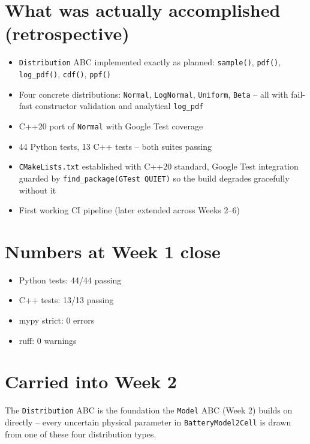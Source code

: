 \documentclass[11pt]{article}
\begin{document}
\section*{What was actually accomplished (retrospective)}

\begin{itemize}[leftmargin=*]
  \item \texttt{Distribution} ABC implemented exactly as planned:
    \texttt{sample()}, \texttt{pdf()}, \texttt{log\_pdf()},
    \texttt{cdf()}, \texttt{ppf()}
  \item Four concrete distributions: \texttt{Normal}, \texttt{LogNormal},
    \texttt{Uniform}, \texttt{Beta} -- all with fail-fast constructor
    validation and analytical \texttt{log\_pdf}
  \item C++20 port of \texttt{Normal} with Google Test coverage
  \item 44 Python tests, 13 C++ tests -- both suites passing
  \item \texttt{CMakeLists.txt} established with C++20 standard,
    Google Test integration guarded by \texttt{find\_package(GTest QUIET)}
    so the build degrades gracefully without it
  \item First working CI pipeline (later extended across Weeks 2--6)
\end{itemize}

\section*{Numbers at Week 1 close}
\begin{itemize}[leftmargin=*]
  \item Python tests: 44/44 passing
  \item C++ tests: 13/13 passing
  \item mypy strict: 0 errors
  \item ruff: 0 warnings
\end{itemize}

\section*{Carried into Week 2}
The \texttt{Distribution} ABC is the foundation the \texttt{Model} ABC
(Week 2) builds on directly -- every uncertain physical parameter in
\texttt{BatteryModel2Cell} is drawn from one of these four distribution
types.
\end{document}
